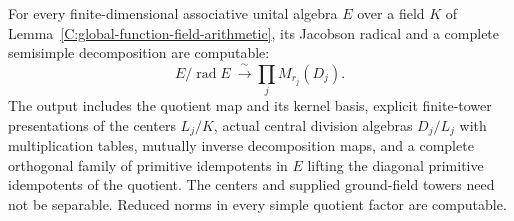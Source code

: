 \begin{theorem}
\label{C:global-function-finite-algebra-algorithms}
For every finite-dimensional associative unital algebra $E$
over a field $K$ of
Lemma~\ref{C:global-function-field-arithmetic}, its Jacobson
radical and a complete semisimple decomposition are computable:
\[
 E/\operatorname{rad}E\ \xrightarrow{\ \sim\ }
                  \prod_j M_{r_j}(D_j).
\]
The output includes the quotient map and its kernel basis,
explicit finite-tower presentations of the centers $L_j/K$,
actual central division algebras $D_j/L_j$ with multiplication
tables, mutually inverse decomposition maps, and a complete
orthogonal family of primitive idempotents in $E$ lifting
the diagonal primitive idempotents of the quotient.
The centers and supplied ground-field towers need not be
separable. Reduced norms in every simple quotient factor
are computable.
\end{theorem}
